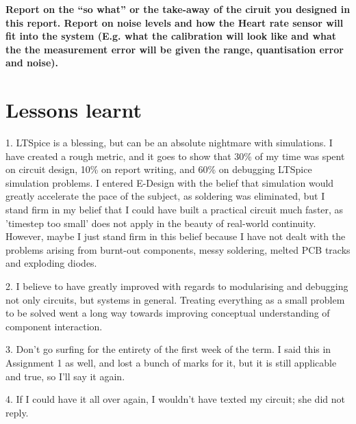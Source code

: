 \textbf{
Report on the ``so what'' or the take-away of the ciruit you designed in this report.  
Report on noise levels and how the Heart rate sensor will fit into the system (E.g. what the calibration will look like and what the the measurement error will be given the range, quantisation error and noise). 
}


\section{Lessons learnt}
1. LTSpice is a blessing, but can be an absolute nightmare with simulations. I have created a rough metric, and it goes to show that 30\% of my time was spent on circuit design, 10\% on report writing, and 60\% on debugging LTSpice simulation problems. I entered E-Design with the belief that simulation would greatly accelerate the pace of the subject, as soldering was eliminated, but I stand firm in my belief that I could have built a practical circuit much faster, as 'timestep too small' does not apply in the beauty of real-world continuity. However, maybe I just stand firm in this belief because I have not dealt with the problems arising from burnt-out components, messy soldering, melted PCB tracks and exploding diodes.

2. I believe to have greatly improved with regards to modularising and debugging not only circuits, but systems in general. Treating everything as a small problem to be solved went a long way towards improving conceptual understanding of component interaction.

3. Don't go surfing for the entirety of the first week of the term. I said this in Assignment 1 as well, and lost a bunch of marks for it, but it is still applicable and true, so I'll say it again.

4. If I could have it all over again, I wouldn't have texted my circuit; she did not reply.